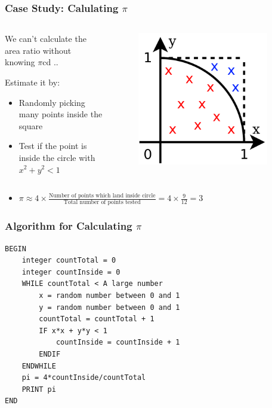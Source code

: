 \documentclass[14pt]{beamer}
\begin{document}
\begin{frame}
\frametitle{Case Study: Calulating $\pi$}
\begin{columns}
\begin{column}{0.6\textwidth}
\begin{itemize}
\small{
\item We can't calculate the area ratio without knowing $\pi$cd ..
\item Estimate it by:
\begin{itemize}
	\item Randomly picking many points inside the square
	\item Test if the point is inside the circle with $x^2 + y^2 < 1$
	\end{itemize}
}
\end{itemize}
\end{column}
\begin{column}{0.4\textwidth}
\begin{figure}
\includegraphics[width=0.9\textwidth]{pi-dots.png}
\end{figure}
\end{column}
\end{columns}
\begin{itemize}
\item $\pi \approx 4 \times \frac{\textrm{Number of points which land inside circle}}{\textrm{Total number of points tested}} = 4 \times \frac{9}{12} = 3$
\end{itemize}
\end{frame}

\begin{frame}[fragile]
\frametitle{Algorithm for Calculating $\pi$}
\begin{lstlisting}[style=pseudo]
BEGIN
	integer countTotal = 0
	integer countInside = 0
	WHILE countTotal < A large number
		x = random number between 0 and 1
		y = random number between 0 and 1
		countTotal = countTotal + 1
		IF x*x + y*y < 1
			countInside = countInside + 1
		ENDIF
	ENDWHILE
	pi = 4*countInside/countTotal
	PRINT pi
END
\end{lstlisting}
\end{frame}
\end{document}
